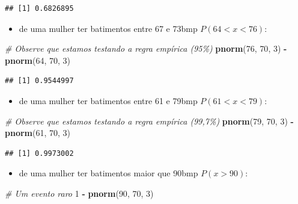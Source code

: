 \documentclass[
]{book}
\newenvironment{Shaded}{\begin{snugshade}}{\end{snugshade}}
\newcommand{\CommentTok}[1]{\textcolor[rgb]{0.56,0.35,0.01}{\textit{#1}}}
\newcommand{\DecValTok}[1]{\textcolor[rgb]{0.00,0.00,0.81}{#1}}
\newcommand{\FunctionTok}[1]{\textcolor[rgb]{0.13,0.29,0.53}{\textbf{#1}}}
\newcommand{\NormalTok}[1]{#1}
\newcommand{\SpecialCharTok}[1]{\textcolor[rgb]{0.81,0.36,0.00}{\textbf{#1}}}
\providecommand{\tightlist}{%
  \setlength{\itemsep}{0pt}\setlength{\parskip}{0pt}}
\begin{document}
\begin{verbatim}
## [1] 0.6826895
\end{verbatim}

\begin{itemize}
\tightlist
\item
  de uma mulher ter batimentos entre 67 e 73bmp \(P(64 < x < 76)\):
\end{itemize}

\begin{Shaded}
\begin{Highlighting}[]
\CommentTok{\# Observe que estamos testando a regra empírica (95\%)}
\FunctionTok{pnorm}\NormalTok{(}\DecValTok{76}\NormalTok{, }\DecValTok{70}\NormalTok{, }\DecValTok{3}\NormalTok{) }\SpecialCharTok{{-}} \FunctionTok{pnorm}\NormalTok{(}\DecValTok{64}\NormalTok{, }\DecValTok{70}\NormalTok{, }\DecValTok{3}\NormalTok{)}
\end{Highlighting}
\end{Shaded}

\begin{verbatim}
## [1] 0.9544997
\end{verbatim}

\begin{itemize}
\tightlist
\item
  de uma mulher ter batimentos entre 61 e 79bmp \(P(61 < x < 79)\):
\end{itemize}

\begin{Shaded}
\begin{Highlighting}[]
\CommentTok{\# Observe que estamos testando a regra empírica (99,7\%)}
\FunctionTok{pnorm}\NormalTok{(}\DecValTok{79}\NormalTok{, }\DecValTok{70}\NormalTok{, }\DecValTok{3}\NormalTok{) }\SpecialCharTok{{-}} \FunctionTok{pnorm}\NormalTok{(}\DecValTok{61}\NormalTok{, }\DecValTok{70}\NormalTok{, }\DecValTok{3}\NormalTok{)}
\end{Highlighting}
\end{Shaded}

\begin{verbatim}
## [1] 0.9973002
\end{verbatim}

\begin{itemize}
\tightlist
\item
  de uma mulher ter batimentos maior que 90bmp \(P(x > 90)\):
\end{itemize}

\begin{Shaded}
\begin{Highlighting}[]
\CommentTok{\# Um evento raro}
\DecValTok{1} \SpecialCharTok{{-}} \FunctionTok{pnorm}\NormalTok{(}\DecValTok{90}\NormalTok{, }\DecValTok{70}\NormalTok{, }\DecValTok{3}\NormalTok{)}
\end{Highlighting}
\end{Shaded}
\end{document}
